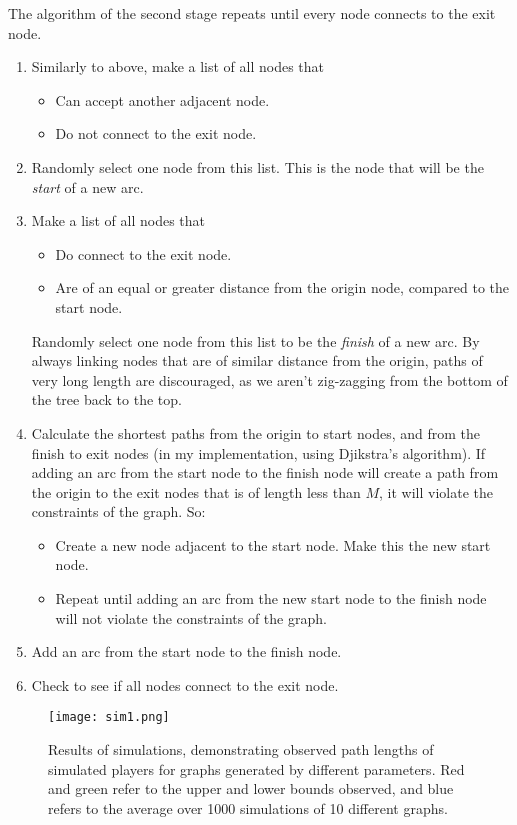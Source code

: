 \documentclass[landscape, a0, final]{a0poster}
\begin{document}
\begin{minipage}{0.50\linewidth}
\begin{minipage}[t]{0.50\linewidth}
\begin{minipage}[t]{0.9\linewidth}
The algorithm of the second stage repeats until every node connects to the exit node. 
\begin{enumerate} 
    \item Similarly to above, make a list of all nodes that 
        \begin{itemize} 
            \item Can accept another adjacent node.
            \item Do not connect to the exit node.
        \end{itemize} 
    \item Randomly select one node from this list.  This is the node that will be the \emph{start} of a new arc.
    \item Make a list of all nodes that 
        \begin{itemize} 
            \item Do connect to the exit node.
            \item Are of an equal or greater distance from the origin node, compared to the start node.
        \end{itemize} 
    Randomly select one node from this list to be the \emph{finish} of a new arc.  By always linking nodes that are of similar distance from the origin, paths of very long length are discouraged, as we aren't zig-zagging from the bottom of the tree back to the top.
    \item Calculate the shortest paths from the origin to start nodes, and from the finish to exit nodes (in my implementation, using Djikstra's algorithm).  If adding an arc from the start node to the finish node will create a path from the origin to the exit nodes that is of length less than $M$, it will violate the constraints of the graph.  So: 
        \begin{itemize} 
            \item Create a new node adjacent to the start node.  Make this the new start node.
            \item Repeat until adding an arc from the new start node to the finish node will not violate the constraints of the graph.
        \end{itemize}
    \item Add an arc from the start node to the finish node.
    \item Check to see if all nodes connect to the exit node.
\end{enumerate} 

\begin{figure}[H]
    \centering
    \texttt{[image: sim1.png]} 
    \caption{Results of simulations, demonstrating observed path lengths of simulated players for graphs generated by different parameters.  Red and green refer to the upper and lower bounds observed, and blue refers to the average over 1000 simulations of 10 different graphs.} 
    \label{sim1}
\end{figure}




\end{minipage}
\end{minipage}
\end{minipage}
\end{document}
